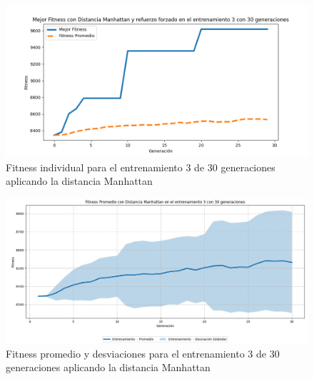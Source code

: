 \documentclass[conference]{IEEEtran}
\begin{document}

\begin{figure}[H]
    \centering
    \includegraphics[width=0.9 \linewidth]{Manhattan/Fitness_individual_30Gen/Fitness_3_Mahn_30Gen.png}
    \caption{Fitness individual para el entrenamiento 3 de 30 generaciones aplicando la distancia Manhattan}
    \label{fig:manhattan_3_30}
\end{figure}
\begin{figure}[H]
    \centering
    \includegraphics[width=0.9 \linewidth]{Manhattan/Fitness_individual_30Gen/Fitness_3_Mahn_30Gen_Sombra.png}
    \caption{Fitness promedio y desviaciones para el entrenamiento 3 de 30 generaciones aplicando la distancia Manhattan}
    \label{fig:manhattan_3_30_sombra}
\end{figure}
\end{document}
